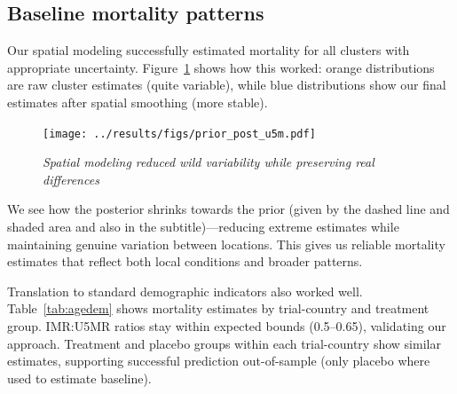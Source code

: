 \documentclass[11pt]{article}\usepackage[]{graphicx}\usepackage[]{xcolor}
\begin{document}
\subsection{Baseline mortality patterns}

Our spatial modeling successfully estimated mortality for all clusters with appropriate uncertainty. Figure~\ref{fig:prior-post-u5m} shows how this worked: orange distributions are raw cluster estimates (quite variable), while blue distributions show our final estimates after spatial smoothing (more stable). 

\begin{figure}[!h]
\centering
\texttt{[image: ../results/figs/prior\_post\_u5m.pdf]}
\caption{\emph{Spatial modeling reduced wild variability while preserving real differences}}
\label{fig:prior-post-u5m}
\end{figure}

We see how the posterior shrinks towards the prior (given by the dashed line and shaded area and also in the subtitle)---reducing extreme estimates while maintaining genuine variation between locations. This gives us reliable mortality estimates that reflect both local conditions and broader patterns.

Translation to standard demographic indicators also worked well. Table~\ref{tab:agedem} shows mortality estimates by trial-country and treatment group. IMR:U5MR ratios stay within expected bounds (0.5--0.65), validating our approach. Treatment and placebo groups within each trial-country show similar estimates, supporting successful prediction out-of-sample (only placebo where used to estimate baseline).
\end{document}
